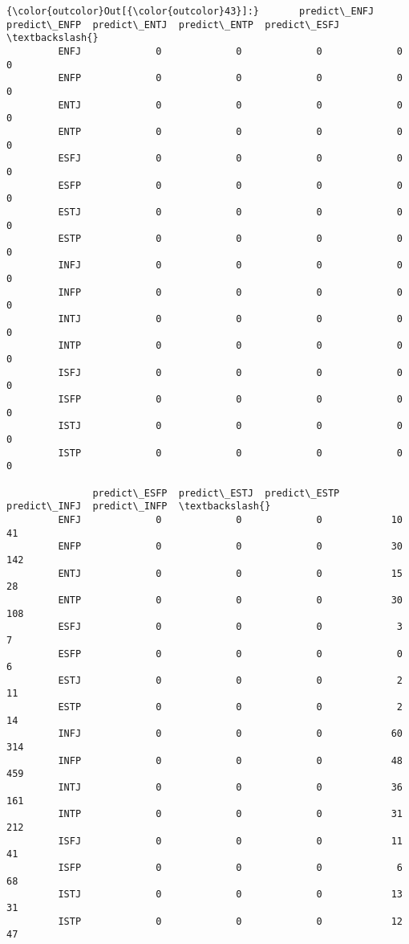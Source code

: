 \documentclass[11pt]{article}
\begin{document}
\begin{Verbatim}[commandchars=\\\{\}]
{\color{outcolor}Out[{\color{outcolor}43}]:}       predict\_ENFJ  predict\_ENFP  predict\_ENTJ  predict\_ENTP  predict\_ESFJ  \textbackslash{}
         ENFJ             0             0             0             0             0   
         ENFP             0             0             0             0             0   
         ENTJ             0             0             0             0             0   
         ENTP             0             0             0             0             0   
         ESFJ             0             0             0             0             0   
         ESFP             0             0             0             0             0   
         ESTJ             0             0             0             0             0   
         ESTP             0             0             0             0             0   
         INFJ             0             0             0             0             0   
         INFP             0             0             0             0             0   
         INTJ             0             0             0             0             0   
         INTP             0             0             0             0             0   
         ISFJ             0             0             0             0             0   
         ISFP             0             0             0             0             0   
         ISTJ             0             0             0             0             0   
         ISTP             0             0             0             0             0   
         
               predict\_ESFP  predict\_ESTJ  predict\_ESTP  predict\_INFJ  predict\_INFP  \textbackslash{}
         ENFJ             0             0             0            10            41   
         ENFP             0             0             0            30           142   
         ENTJ             0             0             0            15            28   
         ENTP             0             0             0            30           108   
         ESFJ             0             0             0             3             7   
         ESFP             0             0             0             0             6   
         ESTJ             0             0             0             2            11   
         ESTP             0             0             0             2            14   
         INFJ             0             0             0            60           314   
         INFP             0             0             0            48           459   
         INTJ             0             0             0            36           161   
         INTP             0             0             0            31           212   
         ISFJ             0             0             0            11            41   
         ISFP             0             0             0             6            68   
         ISTJ             0             0             0            13            31   
         ISTP             0             0             0            12            47   
         

\end{Verbatim}
\end{document}
